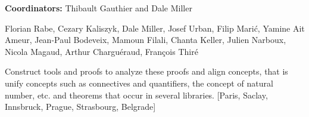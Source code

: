 {\bf Coordinators:} Thibault Gauthier and Dale Miller 

Florian Rabe, Cezary Kaliszyk, Dale Miller, Josef Urban,
Filip Marić, Yamine Ait Ameur, Jean-Paul Bodeveix, Mamoun Filali,
Chanta Keller, Julien Narboux, Nicola Magaud, Arthur Charguéraud,
François Thiré

Construct tools and proofs to analyze these proofs and align concepts,
that is unify concepts such as connectives and quantifiers, the
concept of natural number, etc. and theorems that occur in several
libraries.  [Paris, Saclay, Innsbruck, Prague, Strasbourg, Belgrade]
